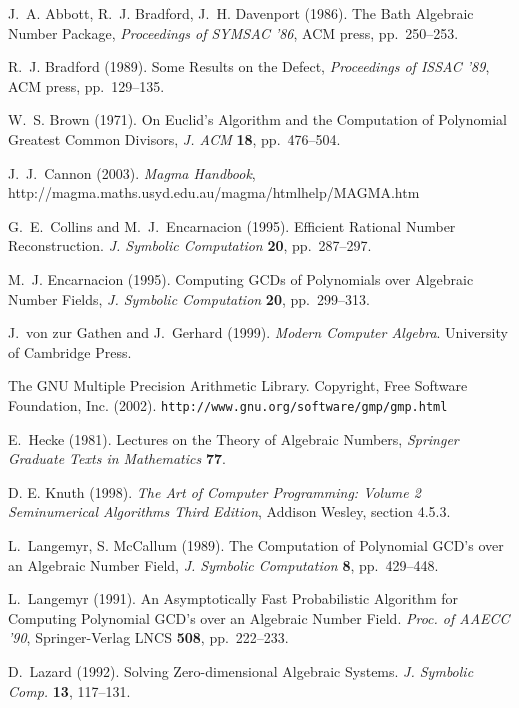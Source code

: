 \documentclass[10pt]{article}
\begin{document}
\begin{thebibliography}{}

 J.~A. Abbott, R.~J. Bradford, J.~H. Davenport (1986).
The Bath Algebraic Number Package,
{\it Proceedings of SYMSAC '86}, ACM press, pp.~250--253.

 R.~J. Bradford (1989).
Some Results on the Defect,
{\it Proceedings of ISSAC '89}, ACM press, pp.~129--135.

 W.~S. Brown (1971).
On Euclid's Algorithm and the Computation of
Polynomial Greatest Common Divisors,
{\it J. ACM} {\bf 18}, pp.~476--504.

 J.~J.~Cannon (2003).
{\it Magma Handbook}, \\
http://magma.maths.usyd.edu.au/magma/htmlhelp/MAGMA.htm

 G.~E.~Collins and M.~J.~Encarnacion (1995).
Efficient Rational Number Reconstruction.
{\it J. Symbolic Computation} {\bf 20}, pp.~287--297.

  M.~J. Encarnacion (1995).
Computing GCDs of Polynomials over Algebraic Number Fields,
{\it J. Symbolic Computation} {\bf 20}, pp.~299--313.

 J.~von zur Gathen and J.~Gerhard (1999).
{\it Modern Computer Algebra}.  University of Cambridge Press.

The GNU Multiple Precision Arithmetic Library.
Copyright, Free Software Foundation, Inc. (2002).
{\tt http://www.gnu.org/software/gmp/gmp.html}

 E.~Hecke (1981).
Lectures on the Theory of Algebraic Numbers,
{\it Springer Graduate Texts in Mathematics} {\bf 77}.


 D. E. Knuth (1998).
{\it The Art of Computer Programming: Volume 2 Seminumerical Algorithms
Third Edition}, Addison Wesley, section 4.5.3.

  L.~Langemyr, S. McCallum (1989).
The Computation of Polynomial GCD's over an Algebraic Number Field,
{\it J. Symbolic Computation} {\bf 8}, pp.~429--448.

 L.~Langemyr (1991).
An Asymptotically Fast Probabilistic Algorithm for Computing
Polynomial GCD's over an Algebraic Number Field.
{\it Proc. of AAECC '90}, Springer-Verlag LNCS {\bf 508}, pp.~222--233.

 D.~Lazard (1992).
Solving Zero-dimensional Algebraic Systems.
{\it J. Symbolic Comp.} {\bf 13}, 117--131.


\end{thebibliography}
\end{document}
